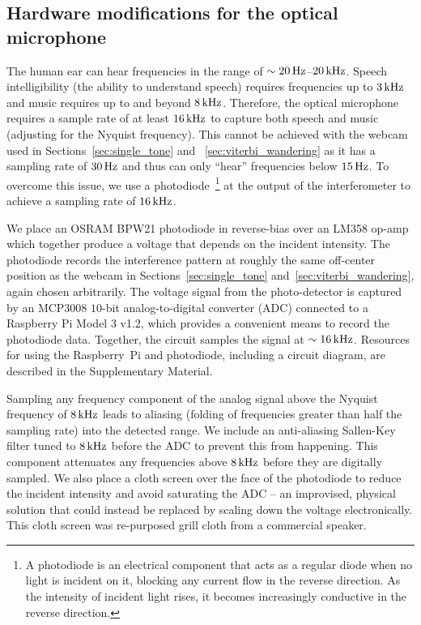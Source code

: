\documentclass[paper-main.tex]{subfiles}
\begin{document}
\subsection{Hardware modifications for the optical microphone}
\label{sec:photodiode}
The human ear can hear frequencies in the range of $\sim 20\,{\rm Hz}$--$20\,{\rm kHz}$. 
Speech intelligibility (the ability to understand speech) requires frequencies up to $3\,{\rm kHz}$ and music requires up to and beyond $8\,{\rm kHz}$. 
Therefore, the optical microphone requires a sample rate of at least $16\,{\rm kHz}$ to capture both speech and music (adjusting for the Nyquist frequency). 
This cannot be achieved with the webcam used in Sections~\ref{sec:single_tone} and ~\ref{sec:viterbi_wandering} as it has a sampling rate of $30\,{\rm Hz}$ and thus can only ``hear'' frequencies below $15\,{\rm Hz}$.
To overcome this issue, we use a photodiode~\footnote{A photodiode is an electrical component that acts as a regular diode when no light is incident on it, blocking any current flow in the reverse direction. As the intensity of incident light rises, it becomes increasingly conductive in the reverse direction.} at the output of the interferometer to achieve a sampling rate of $16\,{\rm kHz}$.

We place an OSRAM BPW21 photodiode in reverse-bias over an LM358 op-amp which together produce a voltage that depends on the incident intensity. 
The photodiode records the interference pattern at roughly the same off-center position as the webcam in Sections~\ref{sec:single_tone} and~\ref{sec:viterbi_wandering}, again chosen arbitrarily. 
The voltage signal from the photo-detector is captured by an MCP3008 $10$-bit analog-to-digital converter (ADC) connected to a Raspberry Pi Model 3 v1.2, which provides a convenient means to record the photodiode data.
Together, the circuit samples the signal at $\sim 16\,{\rm kHz}$. 
Resources for using the Raspberry~Pi and photodiode, including a circuit diagram, are described in the Supplementary Material.

Sampling any frequency component of the analog signal above the Nyquist frequency of $8\,{\rm kHz}$ leads to aliasing (folding of frequencies greater than half the sampling rate) into the detected range. We include an anti-aliasing Sallen-Key filter tuned to $8\,{\rm kHz}$ before the ADC to prevent this from happening. 
This component attenuates any frequencies above $8\,{\rm kHz}$ before they are digitally sampled. We also place a cloth screen over the face of the photodiode to reduce the incident intensity and avoid saturating the ADC -- an improvised, physical solution that could instead be replaced by scaling down the voltage electronically. This cloth screen was re-purposed grill cloth from a commercial speaker.
\end{document}
